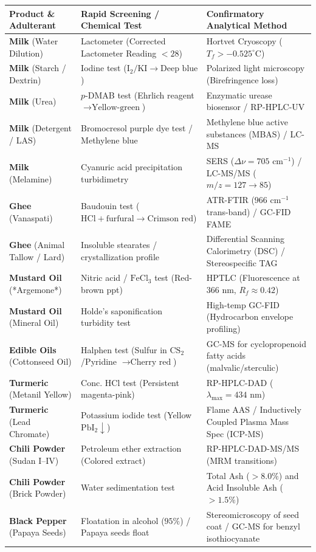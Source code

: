 \documentclass[11pt,a4paper,oneside]{article}
\begin{document}
\begin{center}
\begin{tabular}{@{}p{3.8cm} p{5.6cm} p{6.6cm}@{}}
\toprule
\textbf{Product \& Adulterant} & \textbf{Rapid Screening / Chemical Test} & \textbf{Confirmatory Analytical Method} \tabularnewline
\midrule
\textbf{Milk} (Water Dilution) & Lactometer (Corrected Lactometer Reading $<28$) & Hortvet Cryoscopy ($T_f > -0.525^{\circ}\mathrm{C}$) \tabularnewline
\textbf{Milk} (Starch / Dextrin) & Iodine test ($\text{I}_2/\text{KI} \to \text{Deep blue}$) & Polarized light microscopy (Birefringence loss) \tabularnewline
\textbf{Milk} (Urea) & $p$-DMAB test (Ehrlich reagent $\to \text{Yellow-green}$) & Enzymatic urease biosensor / RP-HPLC-UV \tabularnewline
\textbf{Milk} (Detergent / LAS) & Bromocresol purple dye test / Methylene blue & Methylene blue active substances (MBAS) / LC-MS \tabularnewline
\textbf{Milk} (Melamine) & Cyanuric acid precipitation turbidimetry & SERS ($\Delta\nu = 705\text{ cm}^{-1}$) / LC-MS/MS ($m/z = 127 \to 85$) \tabularnewline
\midrule
\textbf{Ghee} (Vanaspati) & Baudouin test ($\text{HCl} + \text{furfural} \to \text{Crimson red}$) & ATR-FTIR ($966\text{ cm}^{-1}$ trans-band) / GC-FID FAME \tabularnewline
\textbf{Ghee} (Animal Tallow / Lard) & Insoluble stearates / crystallization profile & Differential Scanning Calorimetry (DSC) / Stereospecific TAG \tabularnewline
\midrule
\textbf{Mustard Oil} (*Argemone*) & Nitric acid / $\mathrm{FeCl_3}$ test (Red-brown ppt) & HPTLC (Fluorescence at $366\text{ nm}$, $R_f \approx 0.42$) \tabularnewline
\textbf{Mustard Oil} (Mineral Oil) & Holde's saponification turbidity test & High-temp GC-FID (Hydrocarbon envelope profiling) \tabularnewline
\textbf{Edible Oils} (Cottonseed Oil) & Halphen test (Sulfur in $\mathrm{CS_2}$/Pyridine $\to \text{Cherry red}$) & GC-MS for cyclopropenoid fatty acids (malvalic/sterculic) \tabularnewline
\midrule
\textbf{Turmeric} (Metanil Yellow) & Conc. $\mathrm{HCl}$ test (Persistent magenta-pink) & RP-HPLC-DAD ($\lambda_{\text{max}} = 434\text{ nm}$) \tabularnewline
\textbf{Turmeric} (Lead Chromate) & Potassium iodide test (Yellow $\mathrm{PbI_2}\downarrow$) & Flame AAS / Inductively Coupled Plasma Mass Spec (ICP-MS) \tabularnewline
\midrule
\textbf{Chili Powder} (Sudan I--IV) & Petroleum ether extraction (Colored extract) & RP-HPLC-DAD-MS/MS (MRM transitions) \tabularnewline
\textbf{Chili Powder} (Brick Powder) & Water sedimentation test & Total Ash ($>8.0\%$) and Acid Insoluble Ash ($>1.5\%$) \tabularnewline
\midrule
\textbf{Black Pepper} (Papaya Seeds) & Floatation in alcohol ($95\%$) / Papaya seeds float & Stereomicroscopy of seed coat / GC-MS for benzyl isothiocyanate \tabularnewline

\end{tabular}
\end{center}
\end{document}
